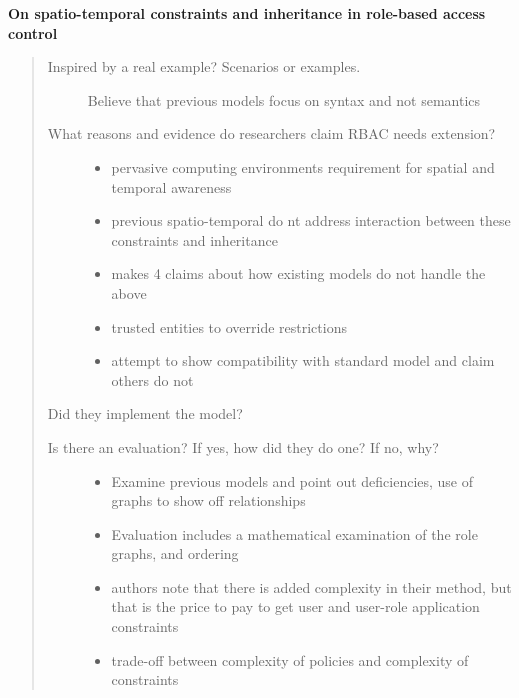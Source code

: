 \documentclass[letterpaper,10pt,english]{sphinxmanual}
\begin{document}
\textbf{On spatio-temporal constraints and inheritance in role-based access control}
\begin{quote}
\begin{description}
\item[{Inspired by a real example? Scenarios or examples.}] \leavevmode
Believe that previous models focus on syntax and not semantics

\item[{What reasons and evidence do researchers claim RBAC needs extension?}] \leavevmode\begin{itemize}
\item {} 
pervasive computing environments requirement for spatial and temporal awareness

\item {} 
previous spatio-temporal do nt address interaction between these constraints and inheritance

\item {} 
makes 4 claims about how existing models do not handle the above

\item {} 
trusted entities to override restrictions

\item {} 
attempt to show compatibility with standard model and claim others do not

\end{itemize}

\end{description}

Did they implement the model?
\begin{description}
\item[{Is there an evaluation? If yes, how did they do one? If no, why?}] \leavevmode\begin{itemize}
\item {} 
Examine previous models and point out deficiencies, use of graphs to show off relationships

\item {} 
Evaluation includes a mathematical examination of the role graphs, and ordering

\item {} 
authors note that there is added complexity in their method, but that is the price to pay to get user  and user-role application constraints

\item {} 
trade-off between complexity of policies and complexity of constraints


\end{itemize}
\end{description}
\end{quote}
\end{document}
